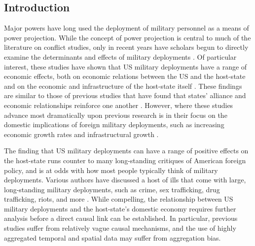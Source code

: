 \documentclass[12pt]{article}
\begin{document}
\begin{doublespace}


\section{Introduction}

Major powers have long used the deployment of military personnel as a means of power projection. While the concept of power projection is central to much of the literature on conflict studies, only in recent years have scholars begun to directly examine the determinants and effects of military deployments \cite{biglaiser2007following,kane2012development,jones2012us,MMM2013,AllenFlynn2013,Allenetal2014,Braithwaite2015}. Of particular interest, these studies have shown that US military deployments have a range of economic effects, both on economic relations between the US and the host-state \cite{biglaiser2007following,biglaiser2009interdependence} and on the economic and infrastructure of the host-state itself \cite{kane2012development,jones2012us}. These findings are similar to those of previous studies that have found that states' alliance and economic relationships reinforce one another \cite{GowaMansfield1993,GowaMansfield2004,Fordham2008}. However, where these studies advance most dramatically upon previous research is in their focus on the domestic implications of foreign military deployments, such as increasing economic growth rates \cite{jones2012us} and infrastructural growth \cite{kane2012development}.

The finding that US military deployments can have a range of positive effects on the host-state runs counter to many long-standing critiques of American foreign policy, and is at odds with how most people typically think of military deployments. Various authors have discussed a host of ills that come with large, long-standing military deployments, such as crime, sex trafficking, drug trafficking, riots, and more . While compelling, the relationship between US military deployments and the host-state's domestic economy requires further analysis before a direct causal link can be established. In particular, previous studies suffer from relatively vague causal mechanisms, and the use of highly aggregated temporal and spatial data may suffer from aggregation bias. 


\end{doublespace}
\end{document}
